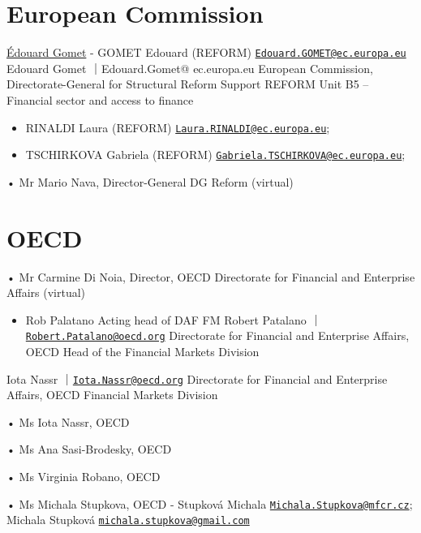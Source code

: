 \documentclass[
]{book}
\providecommand{\tightlist}{%
  \setlength{\itemsep}{0pt}\setlength{\parskip}{0pt}}
\begin{document}
\hypertarget{european-commission}{%
\section{European Commission}\label{european-commission}}

\href{https://www.linkedin.com/in/\%C3\%A9douard-gomet-a4a19761/?originalSubdomain=fr}{Édouard Gomet}
- GOMET Edouard (REFORM) \href{mailto:Edouard.GOMET@ec.europa.eu}{\nolinkurl{Edouard.GOMET@ec.europa.eu}}
Edouard Gomet ｜Edouard.Gomet@ ec.europa.eu
European Commission, Directorate-General for Structural Reform Support
REFORM Unit B5 -- Financial sector and access to finance

\begin{itemize}
\item
  RINALDI Laura (REFORM) \href{mailto:Laura.RINALDI@ec.europa.eu}{\nolinkurl{Laura.RINALDI@ec.europa.eu}};
\item
  TSCHIRKOVA Gabriela (REFORM) \href{mailto:Gabriela.TSCHIRKOVA@ec.europa.eu}{\nolinkurl{Gabriela.TSCHIRKOVA@ec.europa.eu}};
\end{itemize}

• Mr Mario Nava, Director-General DG Reform (virtual)

\hypertarget{oecd}{%
\section{OECD}\label{oecd}}

• Mr Carmine Di Noia, Director, OECD Directorate for Financial and Enterprise Affairs (virtual)

\begin{itemize}
\tightlist
\item
  Rob Palatano Acting head of DAF FM
  Robert Patalano ｜\href{mailto:Robert.Patalano@oecd.org}{\nolinkurl{Robert.Patalano@oecd.org}}
  Directorate for Financial and Enterprise Affairs, OECD
  Head of the Financial Markets Division
\end{itemize}

Iota Nassr ｜\href{mailto:Iota.Nassr@oecd.org}{\nolinkurl{Iota.Nassr@oecd.org}}
Directorate for Financial and Enterprise Affairs, OECD
Financial Markets Division

• Ms Iota Nassr, OECD

• Ms Ana Sasi-Brodesky, OECD

• Ms Virginia Robano, OECD

• Ms Michala Stupkova, OECD
- Stupková Michala \href{mailto:Michala.Stupkova@mfcr.cz}{\nolinkurl{Michala.Stupkova@mfcr.cz}}; Michala Stupková \href{mailto:michala.stupkova@gmail.com}{\nolinkurl{michala.stupkova@gmail.com}}

  
\end{document}
